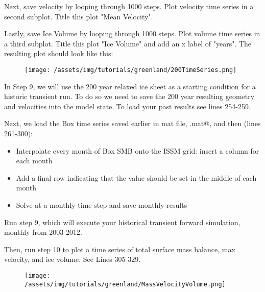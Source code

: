Next, save velocity by looping through 1000 steps. Plot velocity time series in a second subplot. Title this plot "Mean Velocity".

Lastly, save Ice Volume by looping through 1000 steps. Plot volume time series in a third subplot. Title this plot "Ice Volume" and add an x label of "years". The resulting plot should look like this:

\begin{figure}[H]
	\begin{center}
		\texttt{[image: /assets/img/tutorials/greenland/200TimeSeries.png]}
	\end{center}
\end{figure}

In Step 9, we will use the 200 year relaxed ice sheet as a starting condition for a historic transient run. To do so we need to save the 200 year resulting geometry and velocities into the model state. To load your past results see lines 254-259.

Next, we load the Box time series saved earlier in mat file, \verb@smbbox.mat@, and then (lines 261-300):
\begin{itemize}
	\item Interpolate every month of Box SMB onto the ISSM grid: insert a column for each month
	\item Add a final row indicating that the value should be set in the middle of each month
	\item Solve at a monthly time step and save monthly results
\end{itemize}

Run step 9, which will execute your historical transient forward simulation, monthly from 2003-2012.

Then, run step 10 to plot a time series of total surface mass balance, max velocity, and ice volume. See Lines 305-329.

\begin{figure}[H]
	\begin{center}
		\texttt{[image: /assets/img/tutorials/greenland/MassVelocityVolume.png]}
	\end{center}
\end{figure}


